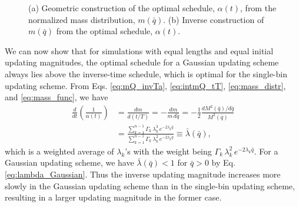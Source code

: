 \documentclass[preprint, superscriptaddress, floatfix]{revtex4-1}
\begin{document}
\begin{figure}[h]\centering
  \caption{
    \label{fig:massq}
    (a) Geometric construction of the optimal schedule,
    $\alpha(t)$,
    from the normalized mass distribution,
    $m(\bar q)$.
    (b) Inverse construction of $m(\bar q)$
    from the optimal schedule, $\alpha(t)$.
  }
\end{figure}

We can now show that
for simulations with equal lengths and
equal initial updating magnitudes,
the optimal schedule for a Gaussian updating scheme
always lies above the inverse-time schedule,
which is optimal for the single-bin updating scheme.
%
From Eqs. \eqref{eq:mQ_invTa}, \eqref{eq:intmQ_tT},
\eqref{eq:mass_distr}, and \eqref{eq:mass_func},
we have
%
\begin{align*}
  \frac{d}{dt}\left(\frac{1}{\alpha(t)}\right)
  &=
  \frac{ dm } { d(t/T) }
  =
  -\frac{dm}{m\,d\bar q}
  =
  -\frac{1}{2} \frac{ dM^2(\bar q)/d\bar q }
  { M^2(\bar q) }
  \\
  &
  =
  \frac{ \sum_{k=1}^{n-1} \Gamma_k \, \lambda_k^3 \, e^{-2\lambda_k \bar q} }
  { \sum_{k=1}^{n-1} \Gamma_k \, \lambda_k^2 \, e^{-2\lambda_k \bar q} }
  \equiv
  \bar\lambda(\bar q)
  ,
\end{align*}
%
which is a weighted average of $\lambda_k$'s
with the weight being $\Gamma_k \, \lambda_k^2 \, e^{-2\lambda_k \bar q}$.
%
For a Gaussian updating scheme,
we have $\bar \lambda(\bar q) < 1$ for $\bar q > 0$
by Eq. \eqref{eq:lambda_Gaussian}.
%
Thus the inverse updating magnitude
increases more slowly
in the Gaussian updating scheme
than in the single-bin updating scheme,
resulting in a larger updating magnitude
in the former case.
\end{document}

